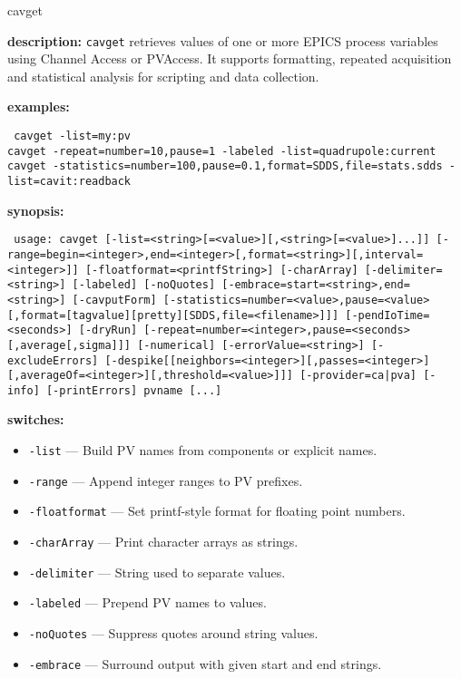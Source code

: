 %
%
\begin{sddsprog}{cavget}
\item \textbf{description:}
\verb+cavget+ retrieves values of one or more EPICS process variables using Channel Access or PVAccess.
It supports formatting, repeated acquisition and statistical analysis for scripting and data collection.
\item \textbf{examples:}
\begin{flushleft}{\tt
cavget -list=my:pv\\
cavget -repeat=number=10,pause=1 -labeled -list=quadrupole:current\\
cavget -statistics=number=100,pause=0.1,format=SDDS,file=stats.sdds -list=cavit:readback
}\end{flushleft}
\item \textbf{synopsis:}
\begin{flushleft}{\tt
usage: cavget [-list=<string>[=<value>][,<string>[=<value>]...]]\
[-range=begin=<integer>,end=<integer>[,format=<string>][,interval=<integer>]]\
[-floatformat=<printfString>] [-charArray] [-delimiter=<string>] [-labeled]\
[-noQuotes] [-embrace=start=<string>,end=<string>] [-cavputForm]\
[-statistics=number=<value>,pause=<value>[,format=[tagvalue][pretty][SDDS,file=<filename>]]]\
[-pendIoTime=<seconds>] [-dryRun] [-repeat=number=<integer>,pause=<seconds>[,average[,sigma]]]\
[-numerical] [-errorValue=<string>] [-excludeErrors]\
[-despike[[neighbors=<integer>][,passes=<integer>][,averageOf=<integer>][,threshold=<value>]]]\
[-provider={ca|pva}] [-info] [-printErrors] pvname [...]
}\end{flushleft}
\item \textbf{switches:}
\begin{itemize}
  \item {\tt -list} --- Build PV names from components or explicit names.
  \item {\tt -range} --- Append integer ranges to PV prefixes.
  \item {\tt -floatformat} --- Set printf-style format for floating point numbers.
  \item {\tt -charArray} --- Print character arrays as strings.
  \item {\tt -delimiter} --- String used to separate values.
  \item {\tt -labeled} --- Prepend PV names to values.
  \item {\tt -noQuotes} --- Suppress quotes around string values.
  \item {\tt -embrace} --- Surround output with given start and end strings.

\end{itemize}
\end{sddsprog}
